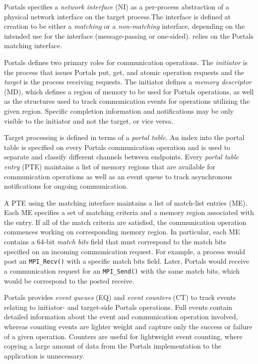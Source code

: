 Portals specifies a {\em network interface} (NI) as a per-process
abstraction of a physical network interface on the target process.The
interface is defined at creation to be either a {\em matching}
or a {\em non-matching} interface, depending on the intended use for
the interface (message-passing or one-sided). \pdht relies on the
Portals matching interface.

Portals defines two primary roles for communication operations. The
{\em initiator} is the process that issues Portals put, get, and atomic operation
requests and the {\em target} is the process receiving
requests. The initiator defines a {\em memory descriptor} (MD), which defines a
region of memory to be used for Portals operations, as well as the
structures used to track communication events for operations utilizing the
given region.  Specific completion information
and notifications may be only visible to the initiator and not the
target, or vice versa.

Target processing is defined in terms of a {\em portal table}. An index into the
portal table is specified on every Portals communication operation and
is used to separate and classify different channels between endpoints.
Every {\em portal table entry} (PTE) maintains a list of memory regions that
are available for communication operations as well as an event queue
to track asynchronous notifications for ongoing communication.

A PTE using the matching interface maintains a list of match-list
entries (ME). Each ME specifies a set of matching criteria and a
memory region associated with the entry. If all of the match criteria
are satisfied, the communication operation commences working on
corresponding memory region. In particular, each ME contains a 64-bit
{\em match bits} field that must correspond to the match bits
specified on an incoming communication request. For example, a process
would post an {\tt MPI\_Recv()} with a specific match bits
field. Later, Portals would receive a communication request for an
{\tt MPI\_Send()} with the same match bits, which would be correspond
to the posted receive.

Portals provides {\em event queues} (EQ) and {\em event counters} (CT) to track events
relating to initiator- and target-side Portals operations.  Full events contain
detailed information about the event and communication operation involved,
whereas counting events are lighter weight and capture only the success or
failure of a given operation.
Counters are useful for lightweight event counting, where copying a
large amount of data from the Portals implementation to the
application is unnecessary.

